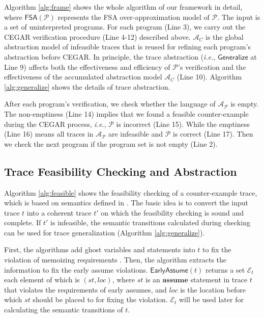 Algorithm \ref{alg:frame} shows the whole algorithm of our framework in detail, where $\mathsf{FSA}(\mathcal{P})$
represents the FSA over-approximation model of $\mathcal{P}$. The input is a set of uninterpreted programs.
For each program (Line 3), we carry out the CEGAR verification procedure (Line 4-12) described above.
$\mathcal{A}_C$ is the global abstraction model of infeasible traces that is reused for refining each program's
abstraction before CEGAR. In principle, the trace abstraction (\emph{i.e.}, $\mathsf{Generalize}$ at Line 9) affects
both the effectiveness and efficiency of $\mathcal{P}$'s verification and the effectiveness of the accumulated
abstraction model $\mathcal{A}_{C}$ (Line 10). Algorithm \ref{alg:generalize} shows the details of trace abstraction.


After each program's verification, we check whether the language of $\mathcal{A}_{\mathcal{P}}$ is empty.
The non-emptiness (Line 14) implies that we found a feasible counter-example during the CEGAR process, \emph{i.e.}, $\mathcal{P}$
is incorrect (Line 15). While the emptiness (Line 16) means all traces in $\mathcal{A}_{\mathcal{P}}$ are infeasible and
$\mathcal{P}$ is correct (Line 17). Then we check the next program if the program set is not empty (Line 2).



\subsection{Trace Feasibility Checking and Abstraction}

Algorithm \ref{alg:feasible} shows the feasibility checking of a counter-example trace, which is based on semantics defined in \cite{POPL19,fm}. The basic idea is to convert the input trace $t$ into a coherent trace $t'$ on which the feasibility checking is sound and complete. If $t'$ is infeasible, the semantic transitions calculated during checking can be used for trace generalization (Algorithm \ref{alg:generalize}).

First, the algorithms add ghost variables and statements into $t$ to fix the violation of memoizing requirements \cite{fm}. Then, the algorithm extracts the information to fix the early assume violations. $\mathsf{EarlyAssume}(t)$ returns a set $\mathcal{E}_t$ each element of which is $(st, loc)$, where $st$ is an $\mathbf{assume}$ statement in trace $t$ that violates the requirements of early assumes, and $loc$ is the location before which $st$ should be placed to for fixing the violation. $\mathcal{E}_t$ will be used later for calculating the semantic transitions of $t$.

